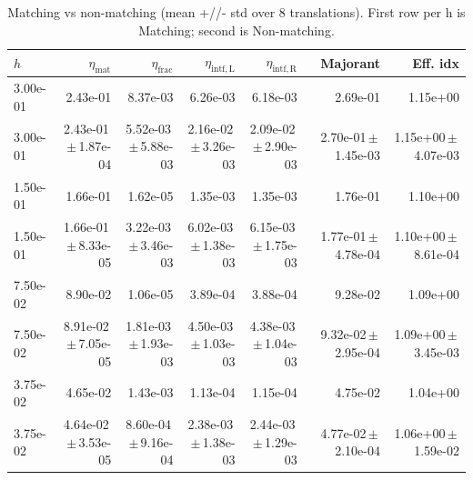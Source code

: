 \begin{table}
\centering
\caption{Matching vs non-matching (mean +//- std over 8 translations). First row per h is Matching; second is Non-matching.}
\label{tab:3d_verification}
\begin{tabular}{lrrrrrr}
\hline
$h$ & $\eta_{\mathrm{mat}}$ & $\eta_{\mathrm{frac}}$ & $\eta_{\mathrm{intf,L}}$ & $\eta_{\mathrm{intf,R}}$ & Majorant & Eff. idx \\ 
\hline
3.00e-01 & 2.43e-01 & 8.37e-03 & 6.26e-03 & 6.18e-03 & 2.69e-01 & 1.15e+00 \\
3.00e-01 & 2.43e-01\,$\pm$\,1.87e-04 & 5.52e-03\,$\pm$\,5.88e-03 & 2.16e-02\,$\pm$\,3.26e-03 & 2.09e-02\,$\pm$\,2.90e-03 & 2.70e-01\,$\pm$\,1.45e-03 & 1.15e+00\,$\pm$\,4.07e-03 \\
1.50e-01 & 1.66e-01 & 1.62e-05 & 1.35e-03 & 1.35e-03 & 1.76e-01 & 1.10e+00 \\
1.50e-01 & 1.66e-01\,$\pm$\,8.33e-05 & 3.22e-03\,$\pm$\,3.46e-03 & 6.02e-03\,$\pm$\,1.38e-03 & 6.15e-03\,$\pm$\,1.75e-03 & 1.77e-01\,$\pm$\,4.78e-04 & 1.10e+00\,$\pm$\,8.61e-04 \\
7.50e-02 & 8.90e-02 & 1.06e-05 & 3.89e-04 & 3.88e-04 & 9.28e-02 & 1.09e+00 \\
7.50e-02 & 8.91e-02\,$\pm$\,7.05e-05 & 1.81e-03\,$\pm$\,1.93e-03 & 4.50e-03\,$\pm$\,1.03e-03 & 4.38e-03\,$\pm$\,1.04e-03 & 9.32e-02\,$\pm$\,2.95e-04 & 1.09e+00\,$\pm$\,3.45e-03 \\
3.75e-02 & 4.65e-02 & 1.43e-03 & 1.13e-04 & 1.15e-04 & 4.75e-02 & 1.04e+00 \\
3.75e-02 & 4.64e-02\,$\pm$\,3.53e-05 & 8.60e-04\,$\pm$\,9.16e-04 & 2.38e-03\,$\pm$\,1.38e-03 & 2.44e-03\,$\pm$\,1.29e-03 & 4.77e-02\,$\pm$\,2.10e-04 & 1.06e+00\,$\pm$\,1.59e-02 \\
\hline
\end{tabular}
\end{table}
